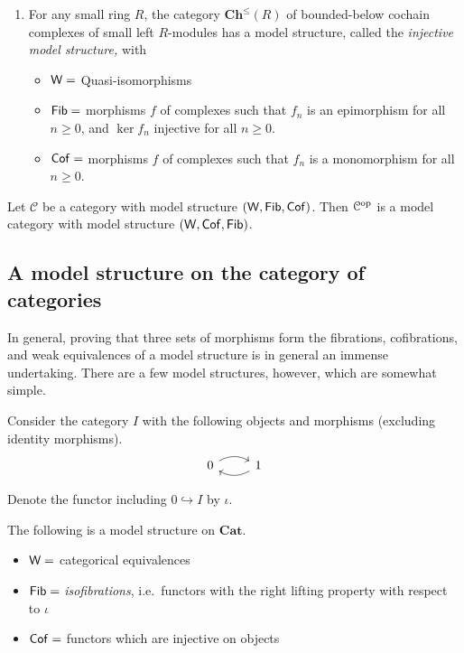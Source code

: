 \documentclass[main.tex]{subfiles}
\begin{document}
\begin{example}
\begin{enumerate}
    \item For any small ring $R$, the category $\mathbf{Ch}^{\leq}(R)$ of bounded-below cochain complexes of small left $R$-modules has a model structure, called the \emph{injective model structure,} with
      \begin{itemize}
        \item $\mathsf{W} = $ Quasi-isomorphisms

        \item $\mathsf{Fib} = $ morphisms $f$ of complexes such that $f_{n}$ is an epimorphism for all $n \geq 0$, and $\ker f_{n}$ injective for all $n \geq 0$.

        \item $\mathsf{Cof} = $ morphisms $f$ of complexes such that $f_{n}$ is a monomorphism for all $n \geq 0$.
      \end{itemize}
  \end{enumerate}
\end{example}

\begin{example}
  \label{eg:opposite_model_category}
  Let $\mathcal{C}$ be a category with model structure $(\mathsf{W}, \mathsf{Fib}, \mathsf{Cof})$. Then $\mathcal{C}^{\mathrm{op}}$ is a model category with model structure $(\mathsf{W}, \mathsf{Cof}, \mathsf{Fib})$.
\end{example}

\subsection{A model structure on the category of categories}
\label{ssc:a_model_structure_on_the_category_of_categories}

In general, proving that three sets of morphisms form the fibrations, cofibrations, and weak equivalences of a model structure is in general an immense undertaking. There are a few model structures, however, which are somewhat simple.

Consider the category $I$ with the following objects and morphisms (excluding identity morphisms).
\begin{equation*}
  \begin{tikzcd}
    0
    \arrow[r, bend left]
    & 1
    \arrow[l, bend left]
  \end{tikzcd}
\end{equation*}

Denote the functor including $0 \hookrightarrow I$ by $\iota$.

The following is a model structure on $\mathbf{Cat}$.
\begin{itemize}
  \item $\mathsf{W} =$ categorical equivalences

  \item $\mathsf{Fib} =$ \emph{isofibrations}, i.e.\ functors with the right lifting property with respect to $\iota$

  \item $\mathsf{Cof} =$ functors which are injective on objects
\end{itemize}
\end{document}
